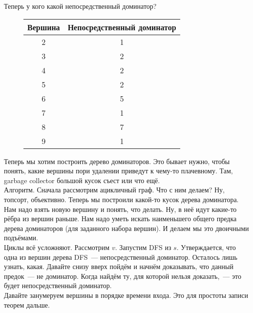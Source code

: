 \documentclass{article}
\begin{document}
    \begin{figure}[H]
    \end{figure}\noindent
    Теперь у кого какой непосредственный доминатор?
    \begin{figure}
        \begin{tabular}{|c|c|}
            \hline
            Вершина & Непосредственный доминатор\\
            \hline
            2 & 1\\
            3 & 2\\
            4 & 2\\
            5 & 2\\
            6 & 5\\
            7 & 1\\
            8 & 7\\
            9 & 1\\
            \hline
        \end{tabular}
    \end{figure}\noindent
    Теперь мы хотим построить дерево доминаторов. Это бывает нужно, чтобы понять, какие вершины пори удалении приведут к чему-то плачевному. Там, garbage collector большой кусок съест или что ещё.\\
    Алгоритм. Сначала рассмотрим ацикличный граф. Что с ним делаем? Ну, топсорт, объективно. Теперь мы построили какой-то кусок дерева доминатора. Нам надо взять новую вершину и понять, что делать. Ну, в неё идут какие-то рёбра из вершин раньше. Нам надо уметь искать наименьшего общего предка дерева доминаторов (для заданного набора вершин). И делаем мы это двоичными подъёмами.\\
    Циклы всё усложняют. Рассмотрим $v$. Запустим DFS из $s$. Утверждается, что одна из вершин дерева DFS~--- непосредственный доминатор. Осталось лишь узнать, какая. Давайте снизу вверх пойдём и начнём доказывать, что данный предок~--- не доминатор. Когда найдём ту, для которой нельзя доказать,~--- это будет непосредственный доминатор.\\
    Давайте занумеруем вершины в порядке времени входа. Это для простоты записи теорем дальше.
\end{document}
